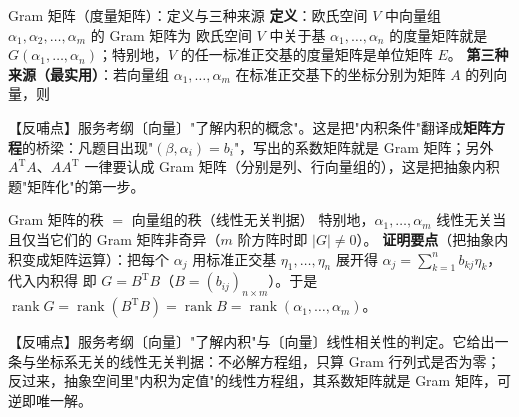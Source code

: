 \begin{fdeep}{Gram 矩阵（度量矩阵）：定义与三种来源}
\textbf{定义}：欧氏空间 $V$ 中向量组 $\alpha_{1},\alpha_{2},\dots,\alpha_{m}$ 的 Gram 矩阵为
欧氏空间 $V$ 中关于基 $\alpha_{1},\dots,\alpha_{n}$ 的度量矩阵就是 $G(\alpha_{1},\dots,\alpha_{n})$；特别地，$V$ 的任一标准正交基的度量矩阵是单位矩阵 $E$。
\textbf{第三种来源（最实用）}：若向量组 $\alpha_{1},\dots,\alpha_{m}$ 在标准正交基下的坐标分别为矩阵 $A$ 的列向量，则

【反哺点】服务考纲〔向量〕"了解内积的概念"。这是把"内积条件"翻译成\textbf{矩阵方程}的桥梁：凡题目出现"$(\beta,\alpha_{i})=b_{i}$"，写出的系数矩阵就是 Gram 矩阵；另外 $A^{\mathrm T}A$、$AA^{\mathrm T}$ 一律要认成 Gram 矩阵（分别是列、行向量组的），这是把抽象内积题"矩阵化"的第一步。
\end{fdeep}


\begin{fdeep}{Gram 矩阵的秩 $=$ 向量组的秩（线性无关判据）}
特别地，$\alpha_{1},\dots,\alpha_{m}$ 线性无关当且仅当它们的 Gram 矩阵非奇异（$m$ 阶方阵时即 $|G|\ne0$）。
\textbf{证明要点}（把抽象内积变成矩阵运算）：把每个 $\alpha_{j}$ 用标准正交基 $\eta_{1},\dots,\eta_{n}$ 展开得 $\alpha_{j}=\sum_{k=1}^{n}b_{kj}\eta_{k}$，代入内积得
即 $G=B^{\mathrm T}B$（$B=(b_{ij})_{n\times m}$）。于是 $\operatorname{rank}G=\operatorname{rank}(B^{\mathrm T}B)=\operatorname{rank}B=\operatorname{rank}(\alpha_{1},\dots,\alpha_{m})$。

【反哺点】服务考纲〔向量〕"了解内积"与〔向量〕线性相关性的判定。它给出一条与坐标系无关的线性无关判据：不必解方程组，只算 Gram 行列式是否为零；反过来，抽象空间里"内积为定值"的线性方程组，其系数矩阵就是 Gram 矩阵，可逆即唯一解。
\end{fdeep}


